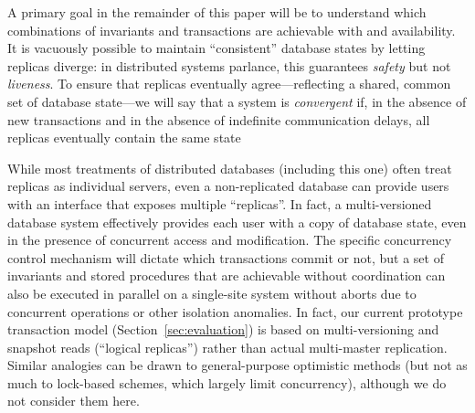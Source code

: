 A primary goal in the remainder of this paper will be to understand
which combinations of invariants and transactions are achievable with
\cfreedom and availability. It is vacuously possible to maintain
``consistent'' database states by letting replicas diverge: in
distributed systems parlance, this guarantees \textit{safety} but not
\textit{liveness}. To ensure that replicas eventually
agree---reflecting a shared, common set of database state---we will
say that a system is \textit{convergent} if, in the absence of new
transactions and in the absence of indefinite communication delays,
all replicas eventually contain the same state

 While most treatments of
distributed databases (including this one) often treat replicas as
individual servers, even a non-replicated database can provide users
with an interface that exposes multiple ``replicas''. In fact, a
multi-versioned database system effectively provides each user with a
copy of database state, even in the presence of concurrent access and
modification. The specific concurrency control mechanism will dictate
which transactions commit or not, but a set of invariants and stored
procedures that are achievable without coordination can also be
executed in parallel on a single-site system without aborts due to
concurrent operations or other isolation anomalies.  In fact, our
current prototype transaction model (Section~\ref{sec:evaluation}) is
based on multi-versioning and snapshot reads (``logical replicas'')
rather than actual multi-master replication. Similar analogies can be
drawn to general-purpose optimistic methods (but not as much to
lock-based schemes, which largely limit concurrency), although we do
not consider them here.
